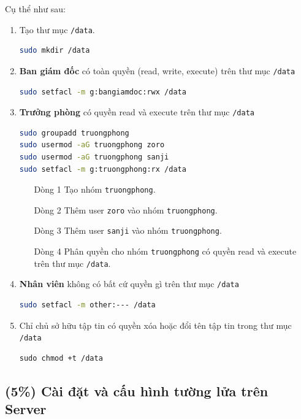 \documentclass[a4paper, 11pt]{article}
\begin{document}
Cụ thể như sau:
\begin{enumerate}
    \item Tạo thư mục \texttt{/data}.
          \begin{lstlisting}[language=bash, caption=Tạo thư mục \texttt{/data}]
sudo mkdir /data
\end{lstlisting}
    \item \textbf{Ban giám đốc} có toàn quyền (read, write, execute) trên thư mục \texttt{/data}
          \begin{lstlisting}[language=bash, caption=Phân quyền cho ban giám đốc]
sudo setfacl -m g:bangiamdoc:rwx /data
\end{lstlisting}
    \item  \textbf{Trưởng phòng} có quyền read và execute trên thư mục \texttt{/data}
          \begin{lstlisting}[language=bash, caption=Phân quyền cho trưởng phòng]
sudo groupadd truongphong
sudo usermod -aG truongphong zoro
sudo usermod -aG truongphong sanji
sudo setfacl -m g:truongphong:rx /data
\end{lstlisting}

          \begin{itemize}
              \item [Dòng 1] Tạo nhóm \texttt{truongphong}.
              \item [Dòng 2] Thêm user \texttt{zoro} vào nhóm \texttt{truongphong}.
              \item [Dòng 3] Thêm user \texttt{sanji} vào nhóm \texttt{truongphong}.
              \item [Dòng 4] Phân quyền cho nhóm \texttt{truongphong} có quyền read và execute trên thư mục \texttt{/data}.
          \end{itemize}
    \item \textbf{Nhân viên} không có bất cứ quyền gì trên thư mục \texttt{/data}
          \begin{lstlisting}[language=bash, caption=Phân quyền cho nhân viên]
sudo setfacl -m other:--- /data
\end{lstlisting}
    \item Chỉ chủ sở hữu tập tin có quyền xóa hoặc đổi tên tập tin trong thư mục \texttt{/data}
          \begin{lstlisting}
sudo chmod +t /data
\end{lstlisting}
\end{enumerate}

\subsection{(5\%) Cài đặt và cấu hình tường lửa trên Server}
\end{document}
